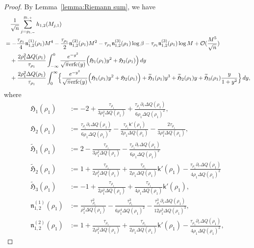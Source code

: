 \documentclass[a4paper]{article}
\numberwithin{equation}{section}
\begin{document}
\begin{proof}
By Lemma~\ref{lemma:Riemann sum}, we have 
\begin{align*}
&\quad \frac{1}{\sqrt{n}}
\sum_{j=g_{1,-}}^{g_{1,+}}
h_{1,2}(M_{j,1})
\\
&=
-\frac{\tau_{\rho_1}}{4}\mathfrak{n}_{1,2}^{(1)}(\rho_1)M^4
-\frac{\tau_{\rho_1}}{2}\mathfrak{n}_{1,2}^{(2)}(\rho_1)M^2
-\tau_{\rho_1}\mathfrak{n}_{1,2}^{(3)}(\rho_1)\log\beta
-\tau_{\rho_1}\mathfrak{n}_{1,2}^{(3)}(\rho_1)\log M
+\mathcal{O}(\frac{M^5}{\sqrt{n}})
\\
&\quad 
+\frac{2\rho_1^2\Delta Q(\rho_1)}{\tau_{\rho_1}}\int_{-\infty}^{0}\frac{e^{-y^2}}{\sqrt{\pi}\mathrm{erfc}(y)}
\Bigl( 
\mathfrak{H}_1(\rho_1)y^2+\mathfrak{H}_2(\rho_1)
\Bigr)\,dy
\\
&\quad 
+\frac{2\rho_1^2\Delta Q(\rho_1)}{\tau_{\rho_1}}
\int_0^{\infty}
\Bigl\{
\frac{e^{-y^2}}{\sqrt{\pi}\mathrm{erfc}(y)}\Bigl(\mathfrak{H}_1(\rho_1)y^2+\mathfrak{H}_2(\rho_1)\Bigr)
+\widetilde{\mathfrak{H}}_1(\rho_1)y^3+\widetilde{\mathfrak{H}}_2(\rho_1)y+\widetilde{\mathfrak{H}}_3(\rho_1)\frac{y}{1+y^2}
\Bigr\}\,dy,
\end{align*}
where 
\begin{align*}
\mathfrak{H}_1(\rho_1)&:=-2+\frac{\tau_{\rho_1}}{3\rho_1^2\Delta Q(\rho_1)}+\frac{\tau_{\rho_1}\partial_r\Delta Q(\rho_1)}{6\rho_1\Delta Q(\rho_1)^2},
\\
\mathfrak{H}_2(\rho_1)&:=
\frac{\tau_{\rho_1}\partial_r\Delta Q(\rho_1)}{6\rho_1\Delta Q(\rho_1)^2}
-\frac{\tau_{\rho_1}\mathsf{k}'(\rho_1)}{2\rho_1\Delta Q(\rho_1)}
-\frac{2\tau_{\rho_1}}{3\rho_1^2\Delta Q(\rho_1)}, 
\\
\widetilde{\mathfrak{H}}_1(\rho_1)&:=2-\frac{\tau_{\rho_1}}{3\rho_1^2\Delta Q(\rho_1)}-\frac{\tau_{\rho_1}\partial_r\Delta Q(\rho_1)}{6\rho_1\Delta Q(\rho_1)^2}
\\
\widetilde{\mathfrak{H}}_2(\rho_1)&:=1+\frac{\tau_{\rho_1}}{2\rho_1^2\Delta Q(\rho_1)}+\frac{\tau_{\rho_1}}{2\rho_1\Delta Q(\rho_1)}\mathsf{k}'(\rho_1)-\frac{\tau_{\rho_1}\partial_r\Delta Q(\rho_1)}{4\rho_1\Delta Q(\rho_1)^2}
\\
\widetilde{\mathfrak{H}}_3(\rho_1)&:=-1+\frac{\tau_{\rho_1}}{2\rho_1^2\Delta Q(\rho_1)}+\frac{\tau_{\rho_1}}{4\rho_1\Delta Q(\rho_1)}\mathsf{k}'(\rho_1),
\\
\mathfrak{n}_{1,2}^{(1)}(\rho_1)&:= \frac{\tau_{\rho_1}^2}{\rho_1^2\Delta Q(\rho_1)}-\frac{\tau_{\rho_1}^3}{6\rho_1^4\Delta Q(\rho_1)^2}-\frac{\tau_{\rho_1}^3\partial_r\Delta Q(\rho_1)}{12\rho_1^3\Delta Q(\rho_1)^3},
\\
\mathfrak{n}_{1,2}^{(2)}(\rho_1)&:= 1+\frac{\tau_{\rho_1}}{2\rho_1^2\Delta Q(\rho_1)}+\frac{\tau_{\rho_1}}{2\rho_1\Delta Q(\rho_1)}\mathsf{k}'(\rho_1)-\frac{\tau_{\rho_1}\partial_r\Delta Q(\rho_1)}{4\rho_1\Delta Q(\rho_1)^2},

\end{align*}
\end{proof}
\end{document}
